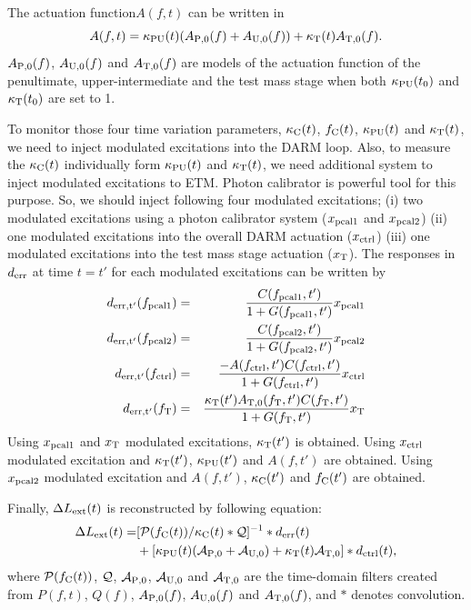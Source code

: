 The actuation function$A(f,t)$ can be written in
\begin{equation}
A(f,t) = \kappa_{\rm PU}(t)(A_{\rm P,0}(f)+A_{\rm U,0}(f)) + \kappa_{\rm T}(t) A_{\rm T,0}(f).
\end{equation}
$A_{\rm P,0}(f)$, $A_{\rm U,0}(f)$ and $A_{\rm T,0}(f)$ are models of the actuation function 
of the penultimate, upper-intermediate and the test mass stage 
when both $\kappa_{\rm PU}(t_0)$ and $\kappa_{\rm T}(t_0)$ are set to 1.

To monitor those four time variation parameters, 
$\kappa_{\rm C}(t)$, $f_{\rm C}(t)$, $\kappa_{\rm PU}(t)$ and $\kappa_{\rm T}(t)$, 
we need to inject modulated excitations into the DARM loop.
Also, to measure the $\kappa_{\rm C}(t)$ individually form $\kappa_{\rm PU}(t)$ and $\kappa_{\rm T}(t)$,
we need additional system to inject modulated excitations to ETM.
Photon calibrator is powerful tool for this purpose.
So, we should inject following four modulated excitations;
(i) two modulated excitations using a photon calibrator system ($x_{\rm pcal1}$ and $x_{\rm pcal2}$)
(ii) one modulated excitations into the overall DARM actuation ($x_{\rm ctrl}$)
(iii) one modulated excitations into the test mass stage actuation ($x_{\rm T}$).
The responses in $d_{\rm err}$ at time $t=t'$ for each modulated excitations can be written by
\begin{eqnarray}
d_{\rm err, t'}(f_{\rm pcal1}) &=& \frac{C(f_{\rm pcal1},t')}{1+G(f_{\rm pcal1},t')} x_{\rm pcal1} \\
d_{\rm err, t'}(f_{\rm pcal2}) &=& \frac{C(f_{\rm pcal2},t')}{1+G(f_{\rm pcal2},t')} x_{\rm pcal2} \\
d_{\rm err, t'}(f_{\rm ctrl}) &=& \frac{-A(f_{\rm ctrl}, t')C(f_{\rm ctrl},t')}{1+G(f_{\rm ctrl},t')} x_{\rm ctrl}  \\
d_{\rm err, t'}(f_{\rm T}) &=& \frac{\kappa_{\rm T}(t') A_{\rm T,0}(f_{\rm T}, t')C(f_{\rm T},t')}{1+G(f_{\rm T},t')} x_{\rm T} 
\end{eqnarray}
Using $x_{\rm pcal1}$ and $x_{\rm T}$ modulated excitations, $\kappa_{\rm T}(t')$ is obtained.
Using $x_{\rm ctrl}$ modulated excitation and $\kappa_{\rm T}(t')$, $\kappa_{\rm PU}(t')$ and $A(f,t')$ are obtained. 
Using $x_{\rm pcal2}$ modulated excitation and $A(f,t')$, $\kappa_{\rm C}(t')$ and $f_{\rm C}(t')$ are obtained.

Finally, $\Delta L_{\rm ext}(t)$ is reconstructed by following equation:
\begin{eqnarray}
\Delta L_{\rm ext}(t) = &[{\cal P}(f_{\rm C}(t))/ \kappa_{\rm C}(t) * {\cal Q} ]^{-1} * d_{\rm err}(t) \nonumber \\
& + [ 
  \kappa_{\rm PU}(t)({\cal A}_{\rm P,0} + {\cal A}_{\rm U,0}) + \kappa_{\rm T}(t) {\cal A}_{\rm T,0}  
]
* d_{\rm ctrl}(t),
\end{eqnarray}
where ${\cal P}(f_{\rm C}(t))$, ${\cal Q}$, ${\cal A_{\rm P,0}}$, ${\cal A_{\rm U,0}}$ and ${\cal A_{\rm T,0}}$  
are the time-domain filters created from $P(f,t)$, $Q(f)$, $A_{\rm P,0}(f)$, $A_{\rm U,0}(f)$ and $A_{\rm T,0}(f)$, and $*$ denotes convolution.

